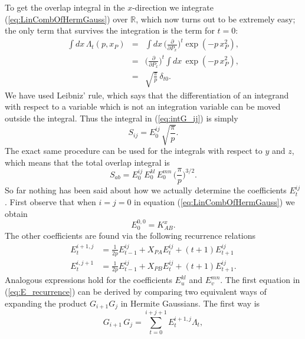 To get the overlap integral in the $x$-direction we integrate (\ref{eq:LinCombOfHermGauss}) over $\mathbb{R}$, which now turns out to be extremely easy;
the only term that survives the integration is the term for $t=0$:
\begin{eqnarray}
 \int dx\,\Lambda_t(p,x_P) & = & \int dx\,\Big(\frac{\partial}{\partial P_x}\Big)^t\exp(-p\,x^2_P), \\
                           & = & \Big(\frac{\partial}{\partial P_x}\Big)^t \int dx\,\exp(-p\,x^2_P), \\
                           & = & \sqrt{\frac{\pi}{p}}\,\delta_{t0}.
\end{eqnarray}
We have used Leibniz' rule, which says that the differentiation of an integrand with respect to a variable which is not an integration variable can
be moved outside the integral. Thus the integral in (\ref{eq:intG_ij}) is simply
\begin{equation}
 S_{ij} = E^{ij}_0\,\sqrt{\frac{\pi}{p}}.
\end{equation}
The exact same procedure can be used for the integrals with respect to $y$ and $z$, which means that the total overlap integral is
\begin{equation}
\label{eq:S_ab}
 S_{ab} = E^{ij}_0\,E^{kl}_0\,E^{mn}_0\,\Big(\frac{\pi}{p}\Big)^{3/2}.
\end{equation}
So far nothing has been said about how we actually determine the coefficients $E^{ij}_t$. First observe that when $i=j=0$ in equation (\ref{eq:LinCombOfHermGauss})
we obtain
\begin{equation}
 E^{0,0}_0 = K_{AB}^x.
\end{equation}
The other coefficients are found via the following recurrence relations
\begin{equation}
\label{eq:E_recurrence}
\begin{split}
 E^{i+1,j}_t & = \frac{1}{2p}E^{ij}_{t-1} + X_{PA}E^{ij}_t + (t+1)E^{ij}_{t+1} \\
 E^{i,j+1}_t & = \frac{1}{2p}E^{ij}_{t-1} + X_{PB}E^{ij}_t + (t+1)E^{ij}_{t+1}.
\end{split}
\end{equation}
Analogous expressions hold for the coefficients $E^{kl}_u$ and $E^{mn}_v$. The first equation in (\ref{eq:E_recurrence}) can be derived by comparing two equivalent ways of expanding the product $G_{i+1}G_j$
in Hermite Gaussians. The first way is
\begin{equation}
 G_{i+1}\,G_j= \sum_{t=0}^{i+j+1}E^{i+1,j}_t \Lambda_t,
\end{equation}
